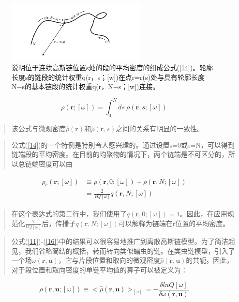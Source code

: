 \begin{figure}[H]
\centering
\includegraphics[width=7cm]{./figures/32.png}
\caption{说明位于连续高斯链位置s处的段的平均密度的组成公式(\ref{14})。轮廓长度s的链段的统计权重q(r，s；[w])在点r=r(s)处与具有轮廓长度N−s的基本链段的统计权重q(r，N−s；[w])连接。}
\label{figure1}
\end{figure}
\begin{equation}\label{15}
\rho(\mathbf{r};[\omega])=\int_{0}^{N}ds~\rho(\mathbf{r},s;[\omega])
\end{equation}
\begin{quotation}
该公式与微观密度$\hat{\rho}(\mathbf{r})$和$\hat{\rho}(\mathbf{r},s)$之间的关系有明显的一致性。
\end{quotation}
\begin{quotation}
公式(\ref{14})的一个特例是特别令人感兴趣的。通过设置s=0或s=N，可以得到链端段的平均密度。在目前的均聚物的情况下，两个链端是不可区分的，所以总链端密度可以由
\end{quotation}
\begin{align}\label{16}
\begin{split}
\rho_e(\mathbf{r};[\omega])&\equiv \rho(\mathbf{r},0;[\omega])+\rho(\mathbf{r},N;[\omega])\\  &=\frac{2}{VQ[\omega]}q(\mathbf{r},N;[\omega])
\end{split}
\end{align}
\begin{quotation}
在这个表达式的第二行中，我们使用了$q(\mathbf{r},0;[\omega])=1$。因此，在应用规范化$\frac{2}{VQ[\omega]}$后，传播子$q(\mathbf{r},N;[\omega])$可以解释为链端在r位置的平均密度。
\end{quotation}
\begin{quotation}
公式(\ref{11})-(\ref{16})中的结果可以很容易地推广到离散高斯链模型。为了简洁起见，我们省略简结的概括，转而转向类似蠕虫的链。在类虫链模型，引入了一个场$\omega(\mathbf{r},\mathbf{u})$，它与片段位置和取向的微观密度$\hat{\rho}(\mathbf{r},\mathbf{u})$的共轭。因此，对于段位置和取向密度的单链平均值的算子可以被定义为：
\end{quotation}
\begin{equation}\label{17}
\rho(\mathbf{r},\mathbf{u};[\omega])\equiv <\hat{\rho}(\mathbf{r},\mathbf{u})>_{[\omega]}=-\frac{\delta lnQ[\omega]}{\delta \omega(\mathbf{r},\mathbf{u})}
\end{equation}
